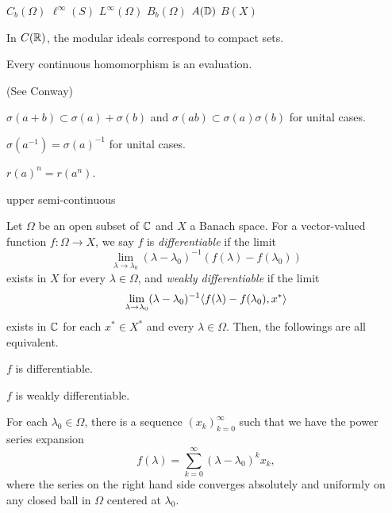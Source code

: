 \documentclass{../../large}
\begin{document}
$C_b(\Omega)$ $\ell^\infty(S)$ $L^\infty(\Omega)$ $B_b(\Omega)$ $A(\mathbb{D})$
$B(X)$

\begin{prb}
In $C(\mathbb{R})$, the modular ideals correspond to compact sets.
\end{prb}

\begin{prb}
\begin{parts}
\item Every continuous homomorphism is an evaluation.
\end{parts}
\end{prb}

\begin{prb}
(See Conway)
\end{prb}

\begin{prb}
\begin{parts}
\item $\sigma(a+b)\subset\sigma(a)+\sigma(b)$ and $\sigma(ab)\subset\sigma(a)\sigma(b)$ for unital cases.
\item $\sigma(a^{-1})=\sigma(a)^{-1}$ for unital cases.
\item $r(a)^n=r(a^n)$.
\end{parts}
\end{prb}

\begin{prb}
\begin{parts}
\item upper semi-continuous
\end{parts}
\end{prb}

\begin{prb}
Let $\Omega$ be an open subset of $\mathbb{C}$ and $X$ a Banach space.
For a vector-valued function $f:\Omega\to X$, we say $f$ is \emph{differentiable} if the limit
\[\lim_{\lambda\to\lambda_0}(\lambda-\lambda_0)^{-1}(f(\lambda)-f(\lambda_0))\]
exists in $X$ for every $\lambda\in\Omega$, and \emph{weakly differentiable} if the limit
\[\lim_{\lambda\to\lambda_0}(\lambda-\lambda_0)^{-1}\langle f(\lambda)-f(\lambda_0),x^*\rangle\]
exists in $\mathbb{C}$ for each $x^*\in X^*$ and every $\lambda\in\Omega$.
Then, the followings are all equivalent.
\begin{parts}
\item $f$ is differentiable.
\item $f$ is weakly differentiable.
\item For each $\lambda_0\in\Omega$, there is a sequence $(x_k)_{k=0}^\infty$ such that we have the power series expansion
\[f(\lambda)=\sum_{k=0}^\infty(\lambda-\lambda_0)^kx_k,\]
where the series on the right hand side converges absolutely and uniformly on any closed ball in $\Omega$ centered at $\lambda_0$.
\end{parts}
\end{prb}
\end{document}
